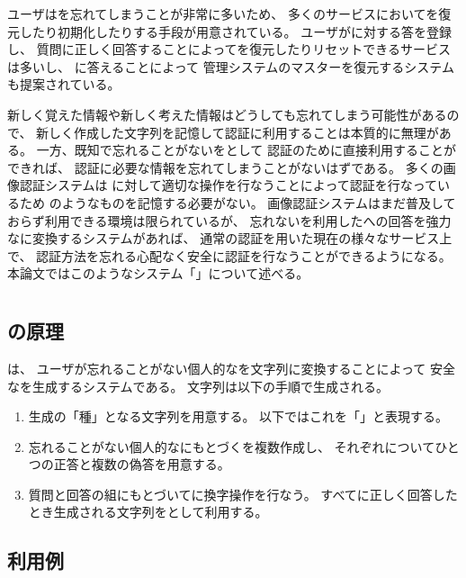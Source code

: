 \documentclass[twoside]{wiss}
\begin{document}
ユーザは{\PW}を忘れてしまうことが非常に多いため、
多くのサービスにおいて{\PW}を復元したり初期化したりする手段が用意されている。
ユーザが{\SQ}に対する答を登録し、
質問に正しく回答することによって{\PW}を復元したりリセットできるサービスは多いし、
{\SQ}に答えることによって
{\PW}管理システムのマスター{\PW}を復元するシステム\cite{平野亮:2011-11-07}も提案されている。

新しく覚えた情報や新しく考えた情報はどうしても忘れてしまう可能性があるので、
新しく作成した{\PW}文字列を記憶して認証に利用することは本質的に無理がある。
一方、既知で忘れることがない{\EM}を{\SQ}として
認証のために直接利用することができれば、
認証に必要な情報を忘れてしまうことがないはずである。
多くの画像認証システム\cite{小池英樹:2006-05-15}は
{\SQ}に対して適切な操作を行なうことによって認証を行なっているため
{\PW}のようなものを記憶する必要がない。
%
画像認証システムはまだ普及しておらず利用できる環境は限られているが、
忘れない{\EM}を利用した{\SQ}への回答を強力な{\PW}に変換するシステムがあれば、
通常の{\PW}認証を用いた現在の様々なサービス上で、
認証方法を忘れる心配なく安全に認証を行なうことができるようになる。
本論文ではこのようなシステム「{\EP}」について述べる。

\section{{\EP}}

\subsection{{\EP}の原理}

{\EP}は、
ユーザが忘れることがない個人的な{\EM}を文字列に変換することによって
安全な{\PW}を生成するシステムである。
{\PW}文字列は以下の手順で生成される。

\begin{enumerate}
\item {\PW}生成の「種」となる文字列を用意する。
以下ではこれを「{\SS}」と表現する。
\item 忘れることがない個人的な{\EM}にもとづく{\SQ}を複数作成し、
それぞれについてひとつの正答と複数の偽答を用意する。
\item 質問と回答の組にもとづいて{\SS}に換字操作を行なう。
すべてに正しく回答したとき生成される文字列を{\PW}として利用する。
\end{enumerate}

\subsection{{\EP}利用例}
\end{document}
